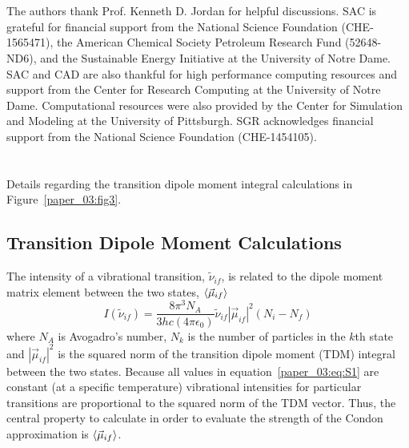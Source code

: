 \documentclass[%
  class = book,%
  crop = false,%
  float = true,%
  multi = true,%
  preview = false,%
]{standalone}
\begin{document}
\section{\texorpdfstring{}{Acknowledgements}}

The authors thank Prof. Kenneth D. Jordan for helpful discussions. SAC is grateful for financial support from the National Science Foundation (CHE-1565471), the American Chemical Society Petroleum Research Fund (52648-ND6), and the Sustainable Energy Initiative at the University of Notre Dame. SAC and CAD are also thankful for high performance computing resources and support from the Center for Research Computing at the University of Notre Dame. Computational resources were also provided by the Center for Simulation and Modeling at the University of Pittsburgh. SGR acknowledges financial support from the National Science Foundation (CHE-1454105).

\section{\texorpdfstring{}{Supporting Information}}
\label{paper_03:sec:SI}

Details regarding the transition dipole moment integral calculations in Figure~\ref{paper_03:fig3}.

\subsection{Transition Dipole Moment Calculations}

The intensity of a vibrational transition, \(\tilde{\nu}_{if}\), is related to the dipole moment matrix element between the two states, \(\Braket{\vec{\mu}_{if}}\)
\begin{equation}
  \label{paper_03:eq:S1}
  I \left( \tilde{\nu}_{if} \right) = \frac{8\pi^{3}N_{A}}{3hc\left( 4\pi\epsilon_{0} \right)} \tilde{\nu}_{if} \left| \vec{\mu}_{if} \right|^{2} (N_{i} - N_{f})
\end{equation}
where \(N_{A}\) is Avogadro's number, \(N_{k}\) is the number of particles in the \(k\)th state and \(\left| \vec{\mu}_{if} \right|^{2}\) is the squared norm of the transition dipole moment (TDM) integral between the two states.\cite{Carbonniere2010} Because all values in equation~\ref{paper_03:eq:S1} are constant (at a specific temperature) vibrational intensities for particular transitions are proportional to the squared norm of the TDM vector. Thus, the central property to calculate in order to evaluate the strength of the Condon approximation is \(\Braket{\vec{\mu}_{if}}\).
\end{document}
